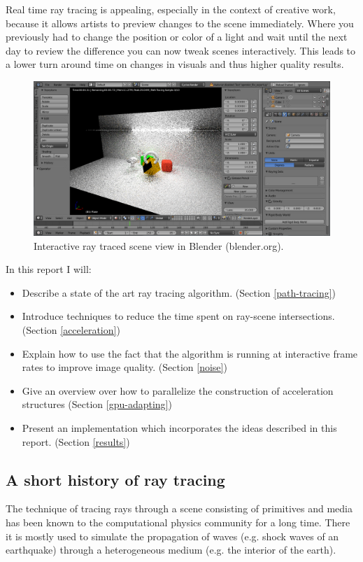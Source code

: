 \documentclass{ACGSeminar}
\begin{document}
Real time ray tracing is appealing, especially in the context of creative work, because it allows artists to preview changes to the scene immediately. Where you previously had to change the position or color of a light and wait until the next day to review the difference you can now tweak scenes interactively. This leads to a lower turn around time on changes in visuals and thus higher quality results.

\begin{figure}[htb!]
  \begin{centering}
    \includegraphics[width=12cm,natwidth=1307,natheight=682]{figures/blender_preview.png}\par
  \end{centering}
  \caption{Interactive ray traced scene view in Blender (blender.org).}
  \label{fig:blender_preview}
\end{figure}

In this report I will:
\begin{itemize}
\item Describe a state of the art ray tracing algorithm. (Section \ref{path-tracing})
\item Introduce techniques to reduce the time spent on ray-scene intersections. (Section \ref{acceleration})
\item Explain how to use the fact that the algorithm is running at interactive frame rates to improve image quality. (Section \ref{noise})
\item Give an overview over how to parallelize the construction of acceleration structures (Section \ref{gpu-adapting}) 
\item Present an implementation which incorporates the ideas described in this report. (Section \ref{results})
\end{itemize}


\subsection{A short history of ray tracing}
The technique of tracing rays through a scene consisting of primitives and media has been known to the computational physics community for a long time. There it is mostly used to simulate the propagation of waves (e.g. shock waves of an earthquake) through a heterogeneous medium (e.g. the interior of the earth). \cite{GJI:GJI93}
\end{document}
